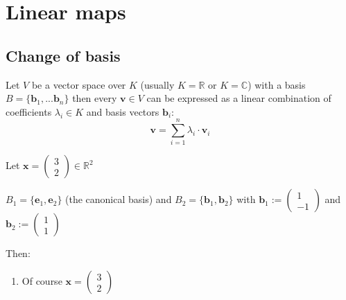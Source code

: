 

\section{Linear maps}

\subsection{Change of basis}



Let $V$ be a vector space over $K$ (usually $K=\mathbb{R}$ or $K=\mathbb{C}$) with a basis $B=\{\bm{b}_1, ... \bm{b}_n\}$ then every $\bm{v} \in V$ can be expressed as a linear combination of coefficients $\lambda_i \in K$ and basis vectors $\bm{b}_i$:
\begin{equation}
    \bm{v} = \sum_{i=1}^n \lambda_i \cdot \bm{v}_i
\end{equation} 

\begin{example}
    Let $\bm{x}=\begin{pmatrix}
    3\\2
    \end{pmatrix} \in \mathbb{R}^2$
    
    $B_1 = \{\bm{e}_1, \bm{e}_2\}$ (the canonical basis) and $B_2=\{\bm{b}_1, \bm{b}_2\}$ with $\bm{b}_1:=\begin{pmatrix}
    1\\-1
    \end{pmatrix}$ and $\bm{b}_2:=\begin{pmatrix}
    1\\1
    \end{pmatrix}$

    Then: 
    \begin{enumerate}[itemsep=3pt, topsep=3pt]
        \item Of course $\bm{x}=\begin{pmatrix}
            3\\2
            \end{pmatrix}$
    \end{enumerate}
\end{example}


